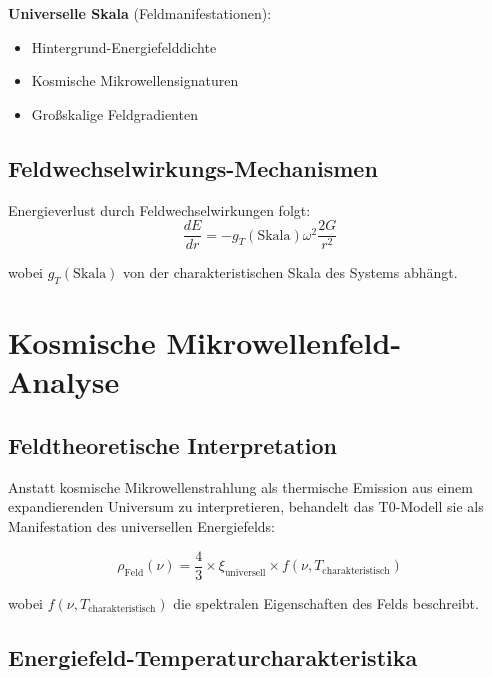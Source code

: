 \documentclass[12pt,a4paper]{article}
\begin{document}
	\textbf{Universelle Skala} (Feldmanifestationen):
	\begin{itemize}
		\item Hintergrund-Energiefelddichte
		\item Kosmische Mikrowellensignaturen
		\item Gro{\ss}skalige Feldgradienten
	\end{itemize}
	
	\subsection{Feldwechselwirkungs-Mechanismen}
	\label{subsec:interaction_mechanisms}
	
	Energieverlust durch Feldwechselwirkungen folgt:
	\begin{equation}
		\frac{dE}{dr} = -g_T(\text{Skala}) \omega^2 \frac{2G}{r^2}
	\end{equation}
	
	wobei $g_T(\text{Skala})$ von der charakteristischen Skala des Systems abh\"angt.
	
	\section{Kosmische Mikrowellenfeld-Analyse}
	\label{sec:cmb_analysis}
	
	\subsection{Feldtheoretische Interpretation}
	\label{subsec:field_interpretation}
	
	Anstatt kosmische Mikrowellenstrahlung als thermische Emission aus einem expandierenden Universum zu interpretieren, behandelt das T0-Modell sie als Manifestation des universellen Energiefelds:
	
	\begin{equation}
		\rho_{\text{Feld}}(\nu) = \frac{4}{3} \times \xi_{\text{universell}} \times f(\nu, T_{\text{charakteristisch}})
	\end{equation}
	
	wobei $f(\nu, T_{\text{charakteristisch}})$ die spektralen Eigenschaften des Felds beschreibt.
	
	\subsection{Energiefeld-Temperaturcharakteristika}
	\label{subsec:energy_temperature}
	
\end{document}
